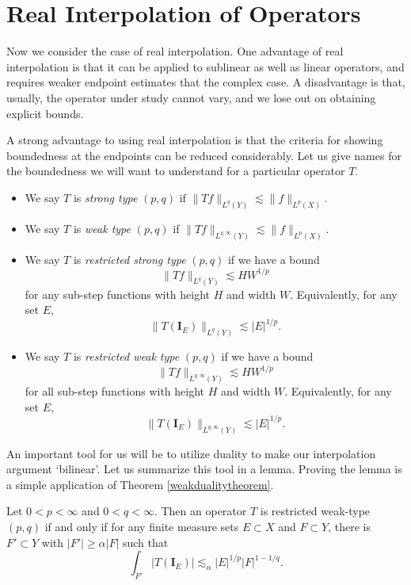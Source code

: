 \section{Real Interpolation of Operators}

Now we consider the case of real interpolation. One advantage of real interpolation is that it can be applied to sublinear as well as linear operators, and requires weaker endpoint estimates that the complex case. A disadvantage is that, usually, the operator under study cannot vary, and we lose out on obtaining explicit bounds.

A strong advantage to using real interpolation is that the criteria for showing boundedness at the endpoints can be reduced considerably. Let us give names for the boundedness we will want to understand for a particular operator $T$.
%
\begin{itemize}
  \item We say $T$ is \emph{strong type} $(p,q)$ if $\| Tf \|_{L^q(Y)} \lesssim \| f \|_{L^p(X)}$.

  \item We say $T$ is \emph{weak type} $(p,q)$ if $\| Tf \|_{L^{q,\infty}(Y)} \lesssim \| f \|_{L^p(X)}$.

  \item We say $T$ is \emph{restricted strong type} $(p,q)$ if we have a bound
  \[ \| Tf \|_{L^q(Y)} \lesssim HW^{1/p} \]
  for any sub-step functions with height $H$ and width $W$. Equivalently, for any set $E$,
  \[ \| T(\mathbf{I}_E) \|_{L^q(Y)} \lesssim |E|^{1/p}. \]

  \item We say $T$ is \emph{restricted weak type} $(p,q)$ if we have a bound
  \[ \| Tf \|_{L^{q,\infty}(Y)} \lesssim HW^{1/p} \]
  for all sub-step functions with height $H$ and width $W$. Equivalently, for any set $E$,
  \[ \| T(\mathbf{I}_E) \|_{L^{q,\infty}(Y)} \lesssim |E|^{1/p}. \]
\end{itemize}
%
An important tool for us will be to utilize duality to make our interpolation argument `bilinear'. Let us summarize this tool in a lemma. Proving the lemma is a simple application of Theorem \ref{weakdualitytheorem}.

\begin{lemma}
  Let $0 < p < \infty$ and $0 < q < \infty$. Then an operator $T$ is restricted weak-type $(p,q)$ if and only if for any finite measure sets $E \subset X$ and $F \subset Y$, there is $F' \subset Y$ with $|F'| \geq \alpha |F|$ such that
  \[ \int_{F'} |T(\mathbf{I}_E)| \lesssim_\alpha |E|^{1/p} |F|^{1-1/q}. \]
\end{lemma}

